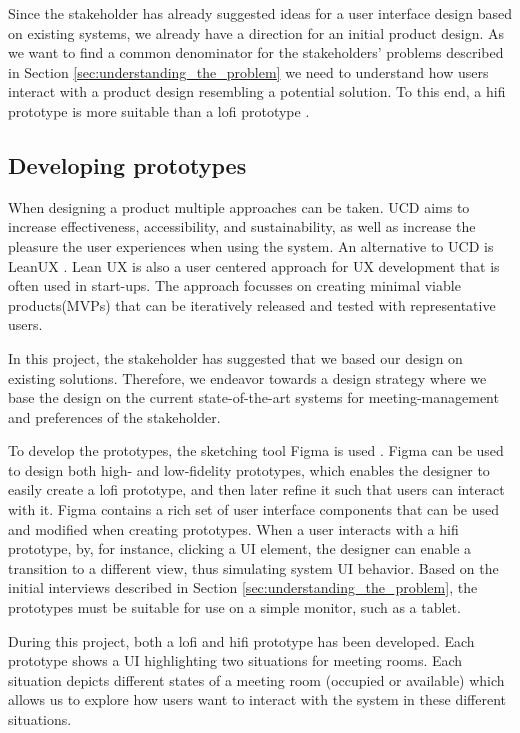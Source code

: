 Since the stakeholder has already suggested ideas for a user interface design based on existing systems, we already have a direction for an initial product design. 
As we want to find a common denominator for the stakeholders' problems described in Section \ref{sec:understanding_the_problem} we need to understand how users interact with a product design resembling a potential solution.
To this end, a hifi prototype is more suitable than a lofi prototype \cite{low-vs-high-fidelity-prototype}.

\subsection{Developing prototypes}
When designing a product multiple approaches can be taken.  
UCD aims to increase effectiveness, accessibility, and sustainability, as well as increase the pleasure the user experiences when using the system\cite{user-centred-design}. 
An alternative to UCD is LeanUX \cite{Lean_UX}.
Lean UX is also a user centered approach for UX development that is often used in start-ups.
The approach focusses on creating minimal viable products(MVPs) that can be iteratively released and tested with representative users.

In this project, the stakeholder has suggested that we based our design on existing solutions.
Therefore, we endeavor towards a design strategy where we base the design on the current state-of-the-art systems for meeting-management and preferences of the stakeholder.

To develop the prototypes, the sketching tool Figma is used \cite{Figma}.
Figma can be used to design both high- and low-fidelity prototypes, which enables the designer to easily create a lofi prototype, and then later refine it such that users can interact with it.
Figma contains a rich set of user interface components that can be used and modified when creating prototypes.
When a user interacts with a hifi prototype, by, for instance, clicking a UI element, the designer can enable a transition to a different view, thus simulating system UI behavior.
Based on the initial interviews described in Section \ref{sec:understanding_the_problem}, the prototypes must be suitable for use on a simple monitor, such as a tablet.

During this project, both a lofi and hifi prototype has been developed.
Each prototype shows a UI highlighting two situations for meeting rooms. 
Each situation depicts different states of a meeting room (occupied or available) which allows us to explore how users want to interact with the system in these different situations. 


